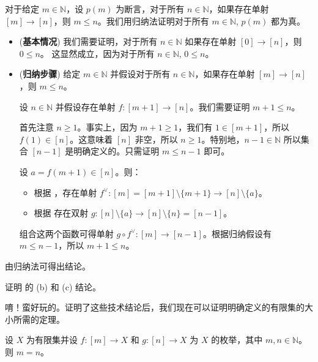 \begin{cproof}[of (a)]
对于给定 $m \in \mathbb{N}$，设 $p(m)$ 为断言，对于所有 $n \in \mathbb{N}$，如果存在单射 $[m] \to [n]$，则 $m \le n$。我们用归纳法证明对于所有 $m \in \mathbb{N}$,  $p(m)$ 都为真。

\begin{itemize}
\item (\textbf{基本情况}) 我们需要证明，对于所有 $n \in \mathbb{N}$ 如果存在单射 $[0] \to [n]$，则 $0 \le n$。 这显然成立，因为对于所有 $n \in \mathbb{N}$, $0 \le n$。
\item (\textbf{归纳步骤}) 给定 $m \in \mathbb{N}$ 并假设对于所有 $n \in \mathbb{N}$，如果存在单射 $[m] \to [n]$，则 $m \le n$。

设 $n \in \mathbb{N}$ 并假设存在单射 $f : [m+1] \to [n]$。我们需要证明 $m+1 \le n$。

首先注意 $n \ge 1$。事实上，因为 $m+1 \ge 1$，我们有 $1 \in [m+1]$，所以 $f(1) \in [n]$。这意味着 $[n]$ 非空，所以 $n \ge 1$。特别地，$n-1 \in \mathbb{N}$ 所以集合 $[n-1]$ 是明确定义的。只需证明 $m \le n-1$ 即可。

设 $a = f(m+1) \in [n]$。则：
\begin{itemize}
\item 根据 ，存在单射 $f^{\vee} : [m] = [m+1] \setminus \{ m+1 \} \to [n] \setminus \{ a \}$。
\item 根据  存在双射 $g : [n] \setminus \{ a \} \to [n] \setminus \{ n \} = [n-1]$。
\end{itemize}

组合这两个函数可得单射 $g \circ f^{\vee} : [m] \to [n-1]$。根据归纳假设有 $m \le n-1$，所以 $m+1 \le n$。
\end{itemize}
由归纳法可得出结论。
\end{cproof}

\begin{exercise}
证明  的 (b) 和 (c) 结论。
\end{exercise}
唷！蛮好玩的。证明了这些技术结论后，我们现在可以证明明确定义的有限集的大小所需的定理。

\begin{theorem}[大小唯一性]
\label{thmUniquenessOfSize}
设 $X$ 为有限集并设 $f : [m] \to X$ 和 $g : [n] \to X$ 为 $X$ 的枚举，其中 $m,n \in \mathbb{N}$。则 $m=n$。
\end{theorem}

